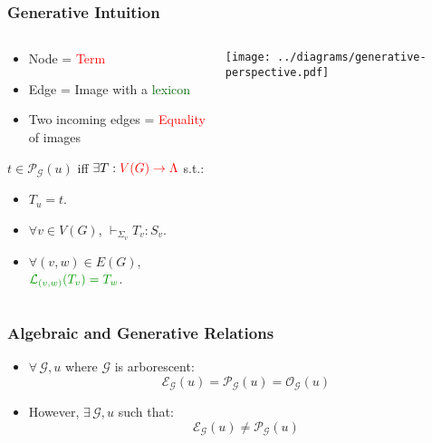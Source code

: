 \documentclass{beamer}
\begin{document}
\begin{frame}
  \frametitle{Generative Intuition}

  \begin{columns}[c]
    \begin{column}{0.7\textwidth}
      \begin{block}{}
        \begin{itemize}
        \item Node = \textcolor{red}{Term}
        \item Edge = Image with a \textcolor{darkgreen}{lexicon}
        \item Two incoming edges = \textcolor{red}{Equality} of images
        \end{itemize}
      \end{block}

      \vspace{3 mm}

      $t \in \mathcal{P}_{\mathcal{G}}(u)$ iff $\exists T :
      \textcolor{red}{V(G) \to \Lambda}$ s.t.:
      \begin{itemize}
      \item $T_u = t$.
      \item $\forall v \in V(G)$, $\vdash_{\Sigma_v} T_v : S_v$.
      \item $\forall (v,w) \in E(G)$,
        $\textcolor{darkgreen}{\mathcal{L}_{(v,w)}(T_v) = T_w}$.
      \end{itemize}
    \end{column}
    \begin{column}{0.3\textwidth}
      \texttt{[image: ../diagrams/generative-perspective.pdf]}
    \end{column}
  \end{columns}
\end{frame}


\begin{frame}
  \frametitle{Algebraic and Generative Relations}


  \begin{itemize}
  \item $\forall \, \mathcal{G}, u$ where $\mathcal{G}$ is arborescent:
    $$\mathcal{E}_{\mathcal{G}}(u) = \mathcal{P}_{\mathcal{G}}(u)
    = \mathcal{O}_{\mathcal{G}}(u)$$
  \pause
  \item However, $\exists \, \mathcal{G}, u$ such that:
    $$\mathcal{E}_{\mathcal{G}}(u) \neq \mathcal{P}_{\mathcal{G}}(u)$$
  \end{itemize}
\end{frame}
\end{document}
